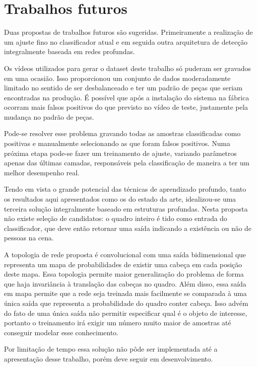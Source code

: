 \section*{Trabalhos futuros}

Duas propostas de trabalhos futuros são sugeridas. Primeiramente a realização de um ajuste fino no classificador atual e em seguida outra arquitetura de detecção integralmente baseada em redes profundas.

Os vídeos utilizados para gerar o dataset deste trabalho só puderam ser gravados em uma ocasião. Isso proporcionou um conjunto de dados moderadamente limitado no sentido de ser desbalanceado e ter um padrão de peças que seriam encontradas na produção. É possível que após a instalação do sistema na fábrica ocorram mais falsos positivos do que previsto no vídeo de teste, justamente pela mudança no padrão de peças.

Pode-se resolver esse problema gravando todas as amostras classificadas como positivas e manualmente selecionando as que foram falsos positivos. Numa próxima etapa pode-se fazer um treinamento de ajuste, variando parâmetros apenas das últimas camadas, responsáveis pela classificação de maneira a ter um melhor desempenho real.

Tendo em vista o grande potencial das técnicas de aprendizado profundo, tanto os resultados aqui apresentados como os do estado da arte, idealizou-se uma terceira solução integralmente baseado em estruturas profundas. Nesta proposta não existe seleção de candidatos: o quadro inteiro é tido como entrada do classificador, que deve então retornar uma saída indicando a existência ou não de pessoas na cena.

A topologia de rede proposta é convolucional com uma saída bidimensional que representa um mapa de probabilidades de existir uma cabeça em cada posição deste mapa. Essa topologia permite maior generalização do problema de forma que haja invariância à translação das cabeças no quadro. Além disso, essa saída em mapa permite que a rede seja treinada mais facilmente se comparada à uma única saída que representa a probabilidade do quadro conter cabeça. Isso advém do fato de uma única saída não permitir especificar qual é o objeto de interesse, portanto o treinamento irá exigir um número muito maior de amostras até conseguir modelar esse conhecimento.

Por limitação de tempo essa solução não pôde ser implementada até a apresentação desse trabalho, porém deve seguir em desenvolvimento.
